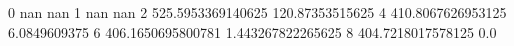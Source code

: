 0 nan nan
1 nan nan
2 525.5953369140625 120.87353515625
4 410.8067626953125 6.0849609375
6 406.1650695800781 1.443267822265625
8 404.7218017578125 0.0
